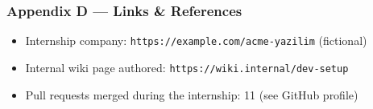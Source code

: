 \documentclass[11pt,a4paper]{article}
\begin{document}
\subsubsection*{Appendix D — Links \& References}
\begin{itemize}
  \item Internship company: \texttt{https://example.com/acme-yazilim} (fictional)
  \item Internal wiki page authored: \texttt{https://wiki.internal/dev-setup}
  \item Pull requests merged during the internship: 11 (see GitHub profile)
\end{itemize}
\end{document}
